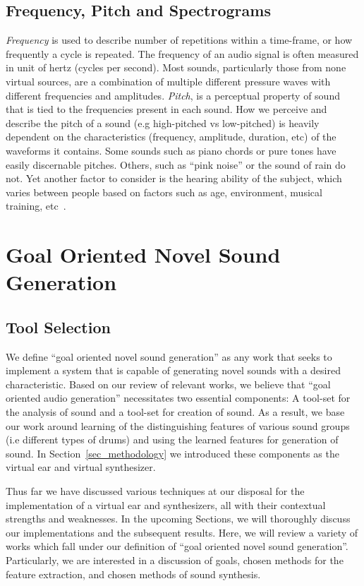 \documentclass[runningheads,a4paper]{llncs}
\begin{document}
\subsection{Frequency, Pitch and Spectrograms}
\textit{Frequency} is used to describe number of repetitions within a time-frame, or how frequently a cycle is repeated. The frequency of an audio signal is often measured in unit of hertz (cycles per second). Most sounds, particularly those from none virtual sources, are a combination of multiple different pressure waves with different frequencies and amplitudes. \textit{Pitch}, is a perceptual property of sound that is tied to the frequencies present in each sound. How we perceive and describe the pitch of a sound (e.g high-pitched vs low-pitched) is heavily dependent on the characteristics (frequency, amplitude, duration, etc) of the waveforms it contains. Some sounds such as piano chords or pure tones have easily discernable pitches. Others, such as \enquote{pink noise} or the sound of rain do not. Yet another factor to consider is the hearing ability of the subject, which varies between people based on factors such as age, environment, musical training, etc~\cite{reiss2016meta,alain2007age,newman2012grm7}. 



\section{Goal Oriented Novel Sound Generation}

\label{related}
\subsection{Tool Selection}
We define \enquote{goal oriented novel sound generation} as any work that seeks to implement a system that is capable of generating novel sounds with a desired characteristic. Based on our review of relevant works, we believe that \enquote{goal oriented audio generation} necessitates two essential components: A tool-set for the analysis of sound and a tool-set for creation of sound. As a result, we base our work around learning of the distinguishing features of various sound groups (i.e different types of drums) and using the learned features for generation of sound. In Section~\ref{sec_methodology} we introduced these components as the virtual ear and virtual synthesizer. 

 Thus far we have discussed various techniques at our disposal for the implementation of a virtual ear and synthesizers, all with their contextual strengths and weaknesses. In the upcoming Sections, we will thoroughly discuss our implementations and the subsequent results. Here, we will review a variety of works which fall under our definition of \enquote{goal oriented novel sound generation}. Particularly, we are interested in a discussion of goals, chosen methods for the feature extraction, and chosen methods of sound synthesis. 
\end{document}
